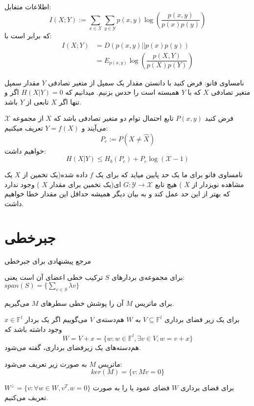 \begin{definition}
اطلاعات متفابل:
$$I(X; Y) := \sum_{x \in \mathcal{X}} \sum_{y \in \mathcal{Y}} p(x, y) \log(\dfrac{p(x, y)}{p(x)p(y)})$$
که برابر است با:
\begin{align*}
    I(X;Y) &= D(p(x, y) || p(x)p(y))
    \\
    &= E_{p(x, y)} \log(\dfrac{p(X, Y)}{p(X)p(Y)})
\end{align*}
\end{definition}
نامساوی فانو: فرض کنید با دانستن مقدار یک سمپل از متغیر تصادفی
$Y$
مقدار سمپل متغیر تصادفی
$X$
که با
$Y$
همبسته است را حدس بزنیم. میدانیم که
$H(X|Y) = 0$
اگر و تنها اگر
$X$
تابعی از
$Y$
باشد. 
\begin{theorem}[
	فانو
	]
فرض کنید
$P(x, y)$
تابع احتمال توام دو متغیر تصادفی باشد که
$X$
از مجموعه
$\mathcal{X}$
می‌آیند و
$Y = f(X)$
تعریف میکنیم:
$$P_e := P(X \neq \hat{X})$$
خواهیم داشت:
$$H(X|Y) \leq H_b(P_e) + P_e \log(\mathcal{X} - 1)$$
\end{theorem}
\begin{remark}
نامساوی فانو برای ما یک حد پایین میاید که برای یک
$f$
داده شده(یک تخمین از
$X$
 یک مشاهده نویزدار از
$X$
) هیچ تابع
$G:\mathcal{Y} \rightarrow \mathcal{X}$
ای(یک تخمین برای مقدار
$X$
) وجود ندارد که بهتر از این حد عمل کند و به بیان دیگر همیشه حداقل این مقدار خطا خواهیم داشت.
\end{remark}
\section{جبرخطی}
مرجع پیشنهادی برای جبرخطی
\cite{sheldon}

\begin{definition}
	برای مجموعه‌ی بردار‌های
	$S$
	ترکیب خطی اعضای آن است یعنی:
	$span(S) = \{ \sum\limits_{v \in S} \lambda v\}$
	
	برای ماتریس
	$M$
آن را پوشش خطی سطرهای 
$M$
می‌گیریم.
\end{definition}

\begin{definition}[
	همدسته
	]
	برای یک زیر فضای برداری
	$V \subseteq \mathbb{F}^l$
	به
	$W$
	هم‌دسته‌‌‌ی
	$V$
	می‌گوییم اگر یک بردار
	$x \in \mathbb{F}^l$
	وجود داشته باشد که
	$$W = V + x = \{w: w \in \mathbb{F}^l, \exists v \in V, w = v + x\}$$
	هم‌دسته‌های یک زیرفضای برداری،
	گفته می‌شود.
\end{definition}
\begin{definition}[
	هسته
	]
	ماتریس
	$M$
	به صورت زیر تعریف می‌شود:
	$$ker(M) = \{v: Mv = 0\}$$
\end{definition}
برای فضای برداری
$W$
فضای عمود یا
 را به صورت
$W^\bot = \{v: \forall w \in W, v^T.w = 0\}$
تعریف می‌کنیم.

